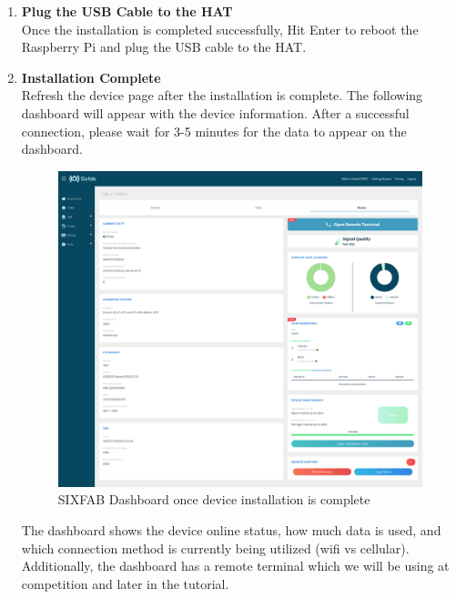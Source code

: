 \documentclass[12pt, letterpaper]{article}
\begin{document}
{{\begin{enumerate}[label=\large{\textbf{\arabic*}.}]
\begin{verbatim}
-----------------------------------------------------------------------
Press ENTER to reboot your system. (Recommended)
Press Ctrl+C (^C) to finish installation without reboot.

Reminder: Plug the USB cable to Sixfab HAT!
Warning: Network priority settings will be effective after reboot!
-----------------------------------------------------------------------
	\end{verbatim}
	\item \textbf{\large{Plug the USB Cable to the HAT}} \\[1\baselineskip]
	\noindent Once the installation is completed successfully, Hit Enter to reboot the Raspberry Pi and plug the USB cable to the HAT.
	\item \textbf{\large{Installation Complete}} \\[1\baselineskip]
	\noindent Refresh the device page after the installation is complete. The following dashboard will appear with the device information. After a successful connection, please wait for 3-5 minutes for the data to appear on the dashboard.
	\begin{figure}[h!]
	\centering
	\includegraphics[width=1\columnwidth]{assets/Sixfab-Connect-SIM-Data-Management-getting-started-modem-kit.png}
	\caption{SIXFAB Dashboard once device installation is complete}
	\end{figure}	
	\newpage \noindent The dashboard shows the device online status, how much data is used, and which connection method is currently being utilized (wifi vs cellular). Additionally, the dashboard has a remote terminal which we will be using at competition and later in the tutorial.
\end{enumerate}

}}
\end{document}
